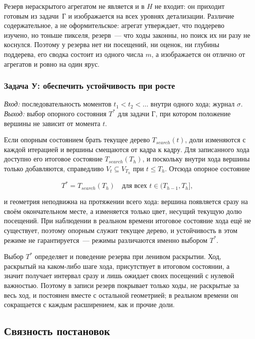 Резерв нераскрытого агрегатом не является и в $H$ не входит: он приходит
готовым из задачи~Г и изображается на всех уровнях детализации. Различие
содержательное, а не оформительское: агрегат утверждает, что поддерево
изучено, но тоньше пикселя, резерв~--- что ходы законны, но поиск их ни разу
не коснулся. Поэтому у резерва нет ни посещений, ни оценок, ни глубины
поддерева, его сводка состоит из одного числа $m$, а изображается он
отлично от агрегатов и ровно на один ярус.

\subsubsection{Задача У: обеспечить устойчивость при росте}

\emph{Вход:} последовательность моментов $t_1 < t_2 < \dots$ внутри одного
хода; журнал $\sigma$.
\emph{Выход:} выбор опорного состояния $T^{*}$ для задачи Г, при котором
положение вершины не зависит от момента $t$.

Если опорным состоянием брать текущее дерево $T_{search}(t)$, доли
изменяются с каждой итерацией и вершины смещаются от кадра к кадру. Для
записанного хода доступно его итоговое состояние $T_{search}(T_h)$, и
поскольку внутри хода вершины только добавляются, справедливо
$V_t \subseteq V_{T_h}$ при $t \le T_h$. Отсюда опорное состояние

\begin{equation}
T^{*} = T_{search}(T_h) \quad\text{для всех } t \in (T_{h-1}, T_h],
\end{equation}

и геометрия неподвижна на протяжении всего хода: вершина появляется сразу
на своём окончательном месте, а изменяется только цвет, несущий текущую
долю посещений. При наблюдении в реальном времени итоговое состояние хода
ещё не существует, поэтому опорным служит текущее дерево, и устойчивость в
этом режиме не гарантируется~--- режимы различаются именно выбором $T^{*}$.

Выбор $T^{*}$ определяет и поведение резерва при ленивом раскрытии. Ход,
раскрытый на каком-либо шаге хода, присутствует в итоговом состоянии, а
значит получает интервал сразу и лишь ожидает своих посещений с нулевой
важностью. Поэтому в записи резерв покрывает только ходы, не раскрытые за
весь ход, и постоянен вместе с остальной геометрией; в реальном времени он
сокращается с каждым расширением, как и прочие доли.

\subsection{Связность постановок}


